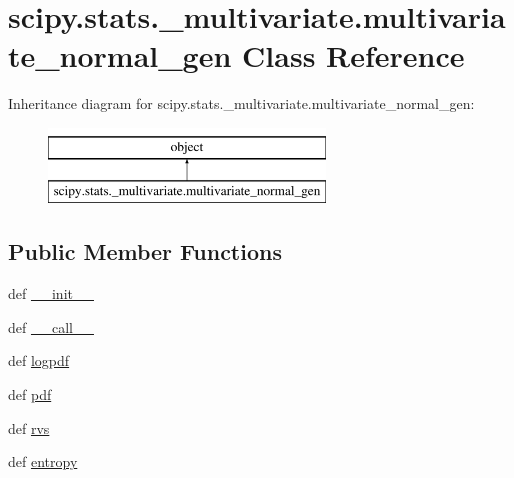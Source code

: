 \hypertarget{classscipy_1_1stats_1_1__multivariate_1_1multivariate__normal__gen}{}\section{scipy.\+stats.\+\_\+multivariate.\+multivariate\+\_\+normal\+\_\+gen Class Reference}
\label{classscipy_1_1stats_1_1__multivariate_1_1multivariate__normal__gen}
Inheritance diagram for scipy.\+stats.\+\_\+multivariate.\+multivariate\+\_\+normal\+\_\+gen\+:\begin{figure}[H]
\begin{center}
\leavevmode
\includegraphics[height=2.000000cm]{classscipy_1_1stats_1_1__multivariate_1_1multivariate__normal__gen}
\end{center}
\end{figure}
\subsection*{Public Member Functions}
\begin{DoxyCompactItemize}
\item 
def \hyperlink{classscipy_1_1stats_1_1__multivariate_1_1multivariate__normal__gen_a2341094950a4a46e7d13d49775713102}{\+\_\+\+\_\+init\+\_\+\+\_\+}
\item 
def \hyperlink{classscipy_1_1stats_1_1__multivariate_1_1multivariate__normal__gen_a1104381df57a9e9a1f96e5f12fd82211}{\+\_\+\+\_\+call\+\_\+\+\_\+}
\item 
def \hyperlink{classscipy_1_1stats_1_1__multivariate_1_1multivariate__normal__gen_a36182794a84c545c140ee5ea7dd2c35a}{logpdf}
\item 
def \hyperlink{classscipy_1_1stats_1_1__multivariate_1_1multivariate__normal__gen_a5c7bba2599c5c2d2d3a69f5705dadbd7}{pdf}
\item 
def \hyperlink{classscipy_1_1stats_1_1__multivariate_1_1multivariate__normal__gen_a7567598f115ba3ea3ea17e6e331472dd}{rvs}
\item 
def \hyperlink{classscipy_1_1stats_1_1__multivariate_1_1multivariate__normal__gen_a453c25906a96e7e4190ed79420ce6d41}{entropy}
\end{DoxyCompactItemize}


